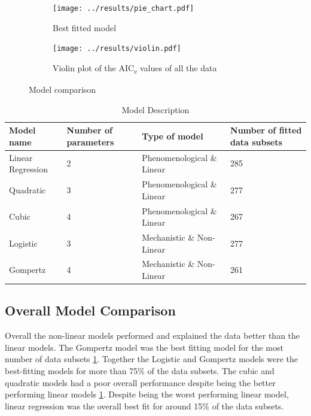 \documentclass[11pt]{article}
\begin{document}
\begin{figure}[!ht]
\begin{subfigure}{.49\textwidth}
  \centering
  \texttt{[image: ../results/pie\_chart.pdf]}
  \caption{Best fitted model}
  \label{fig2:sub-first}
\end{subfigure}
\begin{subfigure}{.49\textwidth}
  \centering
  \texttt{[image: ../results/violin.pdf]}  
  \caption{Violin plot of the AIC\textsubscript{c} values of all the data}
  \label{fig2:sub-second}
\end{subfigure}
\caption{Model comparison}
\label{fig:fig2}
\end{figure}

\begin{table}[!ht]
    \centering
    \begin{tabular}{ | m{3cm} | m{2.3cm}| m{5cm} | m{3cm} |} 
        \hline
        Model name & Number of parameters & Type of model & Number of fitted data subsets \\ 
        \hline
        Linear Regression  & 2 & Phenomenological \& Linear & 285 \\ 
        \hline
        Quadratic & 3 & Phenomenological \& Linear & 277 \\
        \hline
        Cubic & 4 & Phenomenological \& Linear &267 \\
        \hline
        Logistic & 3 & Mechanistic \& Non-Linear &277 \\
        \hline
        Gompertz & 4 & Mechanistic \& Non-Linear &261 \\
        \hline
    \end{tabular}
    \caption{Model Description}
    \label{tab:my_label}
\end{table}

\subsection{Overall Model Comparison}
Overall the non-linear models performed and explained the data better than the linear models. The Gompertz model was the best fitting model for the most number of data subsets \ref{fig2:sub-first}. Together the Logistic and Gompertz models were the best-fitting models for more than 75\% of the data subsets. The cubic and quadratic models had a poor overall performance despite being the better performing linear models \ref{fig2:sub-first}. Despite being the worst performing linear model, linear regression was the overall best fit for around 15\% of the data subsets. 
\end{document}
